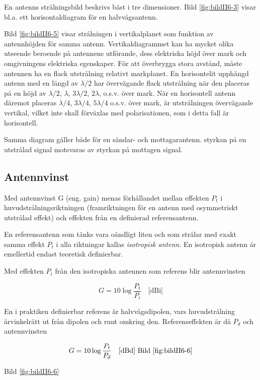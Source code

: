 En antenns strålningsbild beskrivs bäst i tre dimensioner. Bild \ref{fig:bildII6-3}
visar bl.a. ett horisontaldiagram för en halvvågsantenn.

Bild \ref{fig:bildII6-5} visar strålningen i vertikalplanet som funktion av
antennhöjden för samma antenn. Vertikaldiagrammet kan ha mycket olika
utseende beroende på antennens utförande, dess elektriska höjd över
mark och omgivningens elektriska egenskaper. För att överbrygga stora
avstånd, måste antennen ha en flack utstrålning relativt
markplanet. En horisontelit upphängd antenn med en längd av
\(\lambda/2\) har övervägande flack utstrålning när den placeras på en
höjd av \(\lambda/2\), \(\lambda\), \(3\lambda/2\), \(2\lambda\),
o.s.v. över mark. När en horisontell antenn däremot placeras
\(\lambda/4\), \(3\lambda/4\), \(5\lambda/4\) o.s.v. över mark, är
utstrålningen övervägande vertikal, vilket inte skall förväxlas med
polarisationen, som i detta fall är horisontell.

Samma diagram gäller både för en sändar- och mottagarantenn. styrkan
på en utstrålad signal motsvaras av styrkan på mottagen signal.

\subsection{Antennvinst}

Med antennvinst G (eng. gain) menas förhållandet mellan effekten
\(P_t\) i huvudstrålningsriktningen (framriktningen för en antenn med
osymmetriskt utstrålad effekt) och effekten från en definierad
referensantenn.

En referensantenn som tänks vara oändligt liten och som strålar med
exakt samma effekt \(P_t\) i alla riktningar kallas \emph{isotropisk
  antenn}.  En isotropisk antenn är emellertid endast teoretisk
definierbar.

Med effekten \(P_i\) från den isotropiska antennen som referens blir
antennvinsten

\[G = 10 \log\frac{P_t}{P_i} \quad \text{[dBi]}\]

En i praktiken definierbar referens är halvvågsdipolen, vars
huvudstrålning ärvinkelrätt ut från dipolen och runt omkring den.
Referenseffekten är då \(P_d\) och antennvinsten

\[G = 10 \log\frac{P_t}{P_d} \quad \text{[dBd] Bild \ref{fig:bildII6-6}}\]

Bild \ref{fig:bildII6-6}

